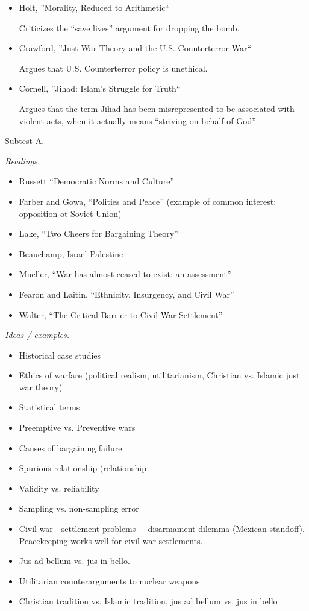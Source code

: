 \documentclass{article}
\begin{document}
\begin{itemize}
    \item Holt, ''Morality, Reduced to Arithmetic``

      Criticizes the ``save lives'' argument for dropping the bomb.

    \item Crawford, ''Just War Theory and the U.S. Counterterror War``

      Argues that U.S. Counterterror policy is unethical.

    \item Cornell, ''Jihad: Islam's Struggle for Truth``

      Argues that the term Jihad has been misrepresented to be associated with violent acts, when it actually means ``striving on behalf of God''

  \end{itemize}

  \newpage 
  Subtest A.

  {\it Readings.}

  \begin{itemize}
    \item Russett ``Democratic Norms and Culture''
    \item Farber and Gowa, ``Polities and Peace'' (example of common interest: opposition ot Soviet Union)
    \item Lake, ``Two Cheers for Bargaining Theory''
    \item Beauchamp, Israel-Palestine
    \item Mueller, ``War has almost ceased to exist: an assessment''
    \item Fearon and Laitin, ``Ethnicity, Insurgency, and Civil War''
    \item Walter, ``The Critical Barrier to Civil War Settlement''
  \end{itemize}

  {\it Ideas / examples.}

  \begin{itemize}
    \item Historical case studies
    \item Ethics of warfare (political realism, utilitarianism, Christian vs. Islamic just war theory)
    \item Statistical terms
    \item Preemptive vs. Preventive wars
    \item Causes of bargaining failure
    \item Spurious relationship (relationship 
    \item Validity vs. reliability
    \item Sampling vs. non-sampling error
    \item Civil war - settlement problems + disarmament dilemma (Mexican standoff).  Peacekeeping works well for civil war settlements.
    \item Jus ad bellum vs. jus in bello.
    \item Utilitarian counterarguments to nuclear weapons

    \item Christian tradition vs. Islamic tradition, jus ad bellum vs. jus in bello
  \end{itemize}
\end{document}
